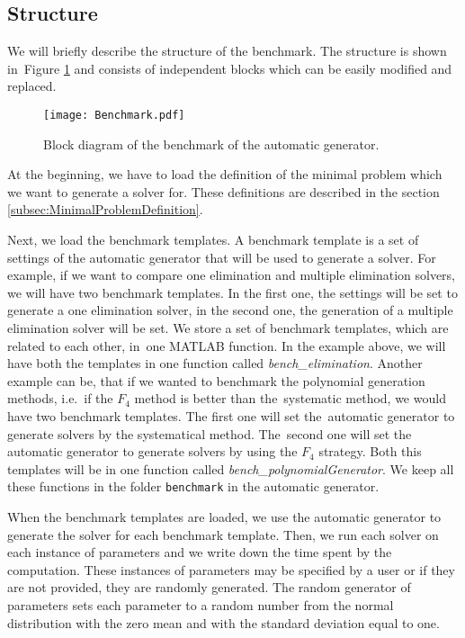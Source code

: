 \subsection{Structure}
We will briefly describe the structure of the benchmark. The structure is shown in~Figure \ref{autogen:benchmark} and consists of independent blocks which can be easily modified and replaced.

\begin{figure}[ht]
  \centering
  \vspace{0.5cm}
  \texttt{[image: Benchmark.pdf]}
  \vspace{0.5cm}
  \caption{Block diagram of the benchmark of the automatic generator.}
  \label{autogen:benchmark}
\end{figure}

At the beginning, we have to load the definition of the minimal problem which we want to generate a solver for. These definitions are described in the section \ref{subsec:MinimalProblemDefinition}.

Next, we load the benchmark templates. A benchmark template is a set of settings of the automatic generator that will be used to generate a solver. For example, if we want to compare one elimination and multiple elimination solvers, we will have two benchmark templates. In the first one, the settings will be set to generate a one elimination solver, in the second one, the generation of a multiple elimination solver will be set. We store a set of benchmark templates, which are related to each other, in~one MATLAB function. In the example above, we will have both the templates in one function called \textit{bench\_elimination}. Another example can be, that if we wanted to benchmark the polynomial generation methods, i.e.\ if the $F_4$ method is better than the~systematic method, we would have two benchmark templates. The first one will set the~automatic generator to generate solvers by the systematical method. The~second one will set the automatic generator to generate solvers by using the $F_4$ strategy. Both this templates will be in one function called \textit{bench\_polynomialGenerator}. We keep all these functions in the folder \texttt{benchmark} in the automatic generator.

When the benchmark templates are loaded, we use the automatic generator to generate the solver for each benchmark template. Then, we run each solver on each instance of parameters and we write down the time spent by the computation. These instances of parameters may be specified by a user or if they are not provided, they are randomly generated. The random generator of parameters sets  each parameter to a random number from the normal distribution with the zero mean and with the standard deviation equal to one.

